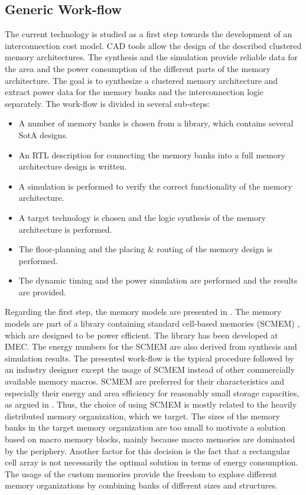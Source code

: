 \subsection{Generic Work-flow}

The current technology is studied as a first step towards the development of an interconnection cost model. 
CAD tools allow the design of the described clustered memory architectures.
The synthesis and the simulation provide reliable data for the area and the power consumption of the different parts of the memory architecture.
The goal is to synthesize a clustered memory architecture and extract power data for the memory banks and the interconnection logic separately.
The work-flow is divided in several sub-steps:

\begin{itemize}
	\item A number of memory banks is chosen from a library, which contains several SotA designs.
	\item An RTL description for connecting the memory banks into a full memory architecture design is written.
	\item A simulation is performed to verify the correct functionality of the memory architecture.
	\item A target technology is chosen and the logic synthesis of the memory architecture is performed.
	\item The floor-planning and the placing \& routing of the memory design is performed.
	\item The dynamic timing and the power simulation are performed and the results are provided.
\end{itemize}

Regarding the first step, the memory models are presented in \cite{filippopoulos2013exploration}.
The memory models are part of a library containing standard cell-based memories (SCMEM) \cite{Mei11}, which are designed to be power efficient. 
The library has been developed at IMEC.
The energy numbers for the SCMEM are also derived from synthesis and simulation results.
The presented work-flow is the typical procedure followed by an industry designer except the usage of SCMEM instead of other commercially available memory macros.
SCMEM are preferred for their characteristics and especially their energy and area efficiency for reasonably small storage capacities, as argued in \cite{Mei10}. 
Thus, the choice of using SCMEM is mostly related to the heavily distributed memory organization, which we target. 
The sizes of the memory banks in the target memory organization are too small to motivate a solution based on macro memory blocks, mainly because macro memories are dominated by the periphery.
Another factor for this decision is the fact that a rectangular cell array is not necessarily the optimal solution in terms of energy consumption.
The usage of the custom memories provide the freedom to explore different memory organizations by combining banks of different sizes and structures.  

